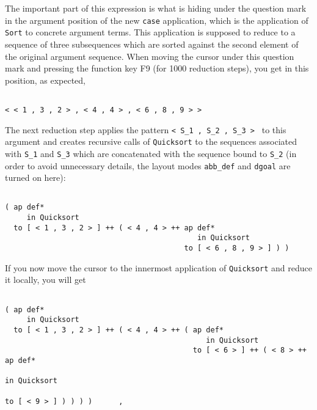 The important part of this expression is what is hiding under the question mark in the
argument position of the new {\tt case} application, which is the application of {\tt Sort}
to concrete argument terms. This application is supposed to reduce to a sequence of
three subsequences which are sorted against the second element of the original argument
sequence. When moving the cursor under this question mark and pressing the function key
F9 (for 1000 reduction steps), you get in this position, as expected,
\begin{verbatim}

< < 1 , 3 , 2 > , < 4 , 4 > , < 6 , 8 , 9 > >

\end{verbatim}
The next reduction step applies the pattern {\tt < S\_1 , S\_2 , S\_3 > } to this argument
and creates recursive calls of {\tt Quicksort} to the sequences associated with
{\tt S\_1} and {\tt S\_3} which are concatenated with the sequence bound to {\tt S\_2}
(in order to avoid unnecessary details, the layout modes {\tt abb\_def} and {\tt dgoal} are
turned on here):
\begin{verbatim}

( ap def* 
     in Quicksort
  to [ < 1 , 3 , 2 > ] ++ ( < 4 , 4 > ++ ap def* 
                                            in Quicksort
                                         to [ < 6 , 8 , 9 > ] ) )

\end{verbatim}
If you now move the cursor to the innermost application of {\tt Quicksort} and reduce it
locally, you will get
\begin{verbatim}

( ap def* 
     in Quicksort
  to [ < 1 , 3 , 2 > ] ++ ( < 4 , 4 > ++ ( ap def* 
                                              in Quicksort
                                           to [ < 6 > ] ++ ( < 8 > ++ ap def* 
                                                                         in Quicksort
                                                                      to [ < 9 > ] ) ) ) )      ,

\end{verbatim}
